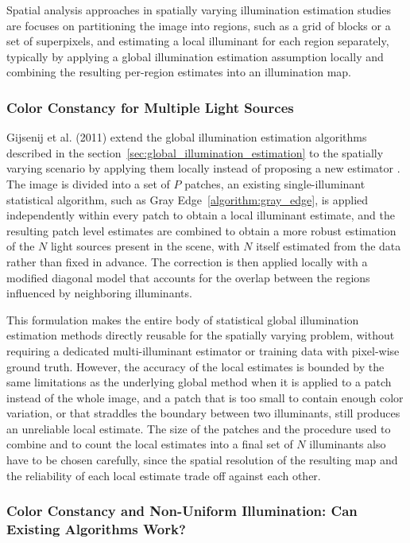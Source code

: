 Spatial analysis approaches in spatially varying illumination estimation studies are focuses on partitioning the image into regions, such as a grid of blocks or a set of superpixels, and estimating a local illuminant for each region separately, typically by applying a global illumination estimation assumption locally and combining the resulting per-region estimates into an illumination map.

\subsubsection{Color Constancy for Multiple Light Sources}

Gijsenij et al. (2011) extend the global illumination estimation algorithms described in the section~\ref{sec:global_illumination_estimation} to the spatially varying scenario by applying them locally instead of proposing a new estimator \cite{gijsenij2011color}. The image is divided into a set of $P$ patches, an existing single-illuminant statistical algorithm, such as Gray Edge~\ref{algorithm:gray_edge}, is applied independently within every patch to obtain a local illuminant estimate, and the resulting patch level estimates are combined to obtain a more robust estimation of the $N$ light sources present in the scene, with $N$ itself estimated from the data rather than fixed in advance. The correction is then applied locally with a modified diagonal model that accounts for the overlap between the regions influenced by neighboring illuminants.

This formulation makes the entire body of statistical global illumination estimation methods directly reusable for the spatially varying problem, without requiring a dedicated multi-illuminant estimator or training data with pixel-wise ground truth. However, the accuracy of the local estimates is bounded by the same limitations as the underlying global method when it is applied to a patch instead of the whole image, and a patch that is too small to contain enough color variation, or that straddles the boundary between two illuminants, still produces an unreliable local estimate. The size of the patches and the procedure used to combine and to count the local estimates into a final set of $N$ illuminants also have to be chosen carefully, since the spatial resolution of the resulting map and the reliability of each local estimate trade off against each other.

\subsubsection{Color Constancy and Non-Uniform Illumination: Can Existing Algorithms Work?}

